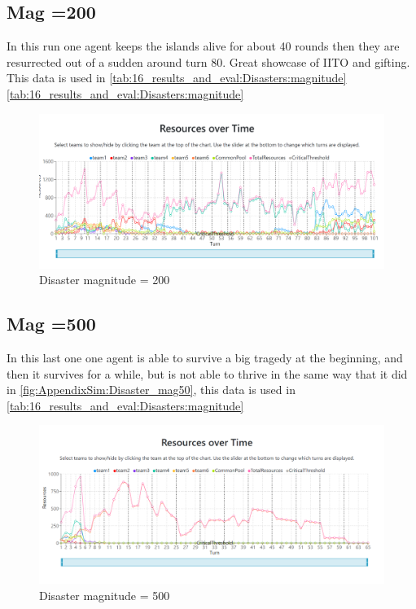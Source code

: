 \subsection{Mag =200}
In this run one agent keeps the islands alive for about 40 rounds then they are resurrected out of a sudden around turn 80. Great showcase of IITO and gifting. This data is used in \ref{tab:16_results_and_eval:Disasters:magnitude}
\ref{tab:16_results_and_eval:Disasters:magnitude}
\begin{figure}[!htb]
    \centering
    \includegraphics[width=\linewidth]{21_appendix_simulation/images/Mag=200.png}
    \caption{Disaster magnitude = 200}
    \label{fig:AppendixSim:Disaster_mag200}
\end{figure}


\subsection{Mag =500}
In this last one one agent is able to survive a big tragedy at the beginning, and then it survives for a while, but is not able to thrive in the same way that it did in \ref{fig:AppendixSim:Disaster_mag50}, this data is used in \ref{tab:16_results_and_eval:Disasters:magnitude}
\begin{figure}[!htb]
    \centering
    \includegraphics[width=\linewidth]{21_appendix_simulation/images/Mag=500.png}
    \caption{Disaster magnitude = 500}
    \label{fig:AppendixSim:Disaster_mag500}
\end{figure}